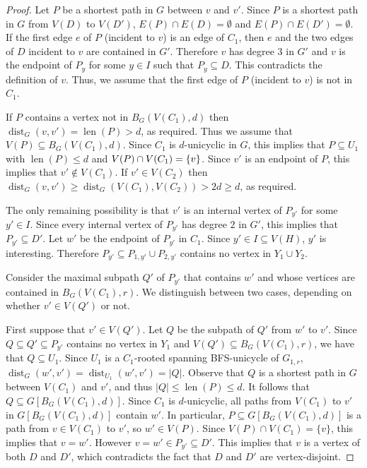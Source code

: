 \documentclass{patmorin}
\newcommand{\gwen}[1]{\textcolor{Purple}{Gwen: #1}}
\newcommand{\piotr}[1]{\textcolor{red}{Piotr: #1}}
\DeclareMathOperator{\len}{len}
\DeclareMathOperator{\dist}{dist}
\DeclarePairedDelimiter\set{\{}{\}}
\begin{document}
\begin{proof}
    
    Let $P$ be a shortest path in $G$ between $v$ and $v'$.  Since $P$ is a shortest path in $G$ from $V(D)$ to $V(D')$, $E(P)\cap E(D)=\emptyset$ and $E(P)\cap E(D')=\emptyset$.  If the first edge $e$ of $P$ (incident to $v$) is an edge of $C_1$, then $e$ and the two edges of $D$ incident to $v$ are contained in $G'$. Therefore $v$ has degree $3$ in $G'$ and $v$ is the endpoint of $P_y$ for some $y\in I$ such that $P_y\subseteq D$.  This contradicts the definition of $v$.
    Thus, we assume that the first edge of $P$ (incident to $v$) is not in $C_1$. 

    If $P$ contains a vertex not in $B_G(V(C_1),d)$ then $\dist_G(v,v')=\len(P)>d$, as required.  Thus we assume that $V(P)\subseteq B_G(V(C_1),d)$. 
    Since $C_1$ is $d$-unicyclic in $G$, this implies that $P\subseteq U_1$ with $\len(P)\leq d$ and $V(P)\cap V(C_1)=\set{v}$.     
    Since $v'$ is an endpoint of $P$, this implies that $v'\notin V(C_1)$.  If $v'\in V(C_2)$ then $\dist_G(v,v')\ge \dist_G(V(C_1),V(C_2))>2d\geq d$, as required.

    The only remaining possibility is that $v'$ is an internal vertex of $P_{y'}$ for some $y'\in I$.  Since every internal vertex of $P_{y'}$ has degree $2$ in $G'$, this implies that  $P_{y'}\subseteq D'$.  
    Let $w'$ be the endpoint of $P_{y'}$ in $C_1$. Since $y'\in I\subseteq V(H)$, $y'$ is interesting.  
    Therefore $P_{y'}\subseteq P_{1,y'}\cup P_{2,y'}$ contains no vertex in $Y_1\cup Y_2$.

    Consider the maximal subpath $Q'$ of $P_{y'}$ that contains $w'$ and whose vertices are contained in $B_G(V(C_1),r)$.  We distinguish between two cases, depending on whether $v'\in V(Q')$ or not.

    First suppose that $v'\in V(Q')$.  
    Let $Q$ be the subpath of $Q'$ from $w'$ to $v'$. Since $Q\subseteq Q'\subseteq P_{y'}$ contains  no vertex in $Y_1$ and $V(Q')\subseteq B_G(V(C_1),r)$, we have that $Q\subseteq U_1$. Since $U_1$ is a $C_1$-rooted spanning BFS-unicycle of $G_{1,r}$, $\dist_G(w',v')=\dist_{U_1}(w',v')=|Q|$.  
    Observe that $Q$ is a shortest path in $G$ between $V(C_1)$ and $v'$, and thus $|Q| \leq \len(P) \leq d$. 
    It follows that $Q\subseteq G[B_G(V(C_1),d)]$.  
    Since $C_1$ is $d$-unicyclic, all paths from $V(C_1)$ to $v'$ in $G[B_G(V(C_1),d)]$ contain $w'$. 
    In particular, $P\subseteq G[B_G(V(C_1),d)]$ is a path from $v\in V(C_1)$ to $v'$, so $w'\in V(P)$.  Since $V(P)\cap V(C_1)=\{v\}$, this implies that $v=w'$. 
    However $v=w' \in P_{y'}\subseteq D'$. This implies that $v$ is a vertex of both $D$ and $D'$, which contradicts the fact that $D$ and $D'$ are vertex-disjoint.


\end{proof}
\end{document}
